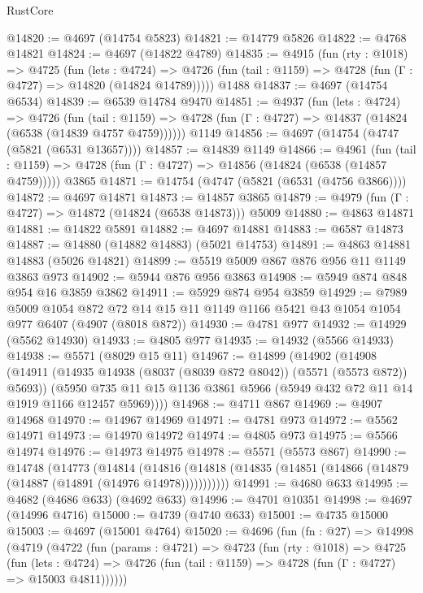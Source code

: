 \begin{lexlean}{RustCore}
\begin{coremodule}
@14820 := @4697 (@14754 @5823)
@14821 := @14779 @5826
@14822 := @4768 @14821
@14824 := @4697 (@14822 @4789)
@14835 := @4915
    (fun (rty : @1018) =>
    @4725
      (fun (lets : @4724) =>
      @4726 (fun (tail : @1159) => @4728 (fun (Γ : @4727) => @14820 (@14824 @14789)))))
    @1488
@14837 := @4697 (@14754 @6534)
@14839 := @6539 @14784 @9470
@14851 := @4937
    (fun (lets : @4724) =>
    @4726
      (fun (tail : @1159) =>
      @4728 (fun (Γ : @4727) => @14837 (@14824 (@6538 (@14839 @4757 @4759))))))
    @1149
@14856 := @4697 (@14754 (@4747 (@5821 (@6531 @13657))))
@14857 := @14839 @1149
@14866 := @4961
    (fun (tail : @1159) => @4728 (fun (Γ : @4727) => @14856 (@14824 (@6538 (@14857 @4759)))))
    @3865
@14871 := @14754 (@4747 (@5821 (@6531 (@4756 @3866))))
@14872 := @4697 @14871
@14873 := @14857 @3865
@14879 := @4979 (fun (Γ : @4727) => @14872 (@14824 (@6538 @14873))) @5009
@14880 := @4863 @14871
@14881 := @14822 @5891
@14882 := @4697 @14881
@14883 := @6587 @14873
@14887 := @14880 (@14882 @14883) (@5021 @14753)
@14891 := @4863 @14881 @14883 (@5026 @14821)
@14899 := @5519 @5009 @867 @876 @956 @11 @1149 @3863 @973
@14902 := @5944 @876 @956 @3863
@14908 := @5949 @874 @848 @954 @16 @3859 @3862
@14911 := @5929 @874 @954 @3859
@14929 := @7989
    @5009
    @1054
    @872
    @72
    @14
    @15
    @11
    @1149
    @1166
    @5421
    @43
    @1054
    @1054
    @977
    @6407
    (@4907 (@8018 @872))
@14930 := @4781 @977
@14932 := @14929 (@5562 @14930)
@14933 := @4805 @977
@14935 := @14932 (@5566 @14933)
@14938 := @5571 (@8029 @15 @11)
@14967 := @14899
    (@14902
      (@14908
        (@14911 (@14935 @14938 (@8037 (@8039 @872 @8042)) (@5571 (@5573 @872)) @5693))
        (@5950 @735 @11 @15 @1136 @3861 @5966 (@5949 @432 @72 @11 @14 @1919 @1166 @12457 @5969))))
@14968 := @4711 @867
@14969 := @4907 @14968
@14970 := @14967 @14969
@14971 := @4781 @973
@14972 := @5562 @14971
@14973 := @14970 @14972
@14974 := @4805 @973
@14975 := @5566 @14974
@14976 := @14973 @14975
@14978 := @5571 (@5573 @867)
@14990 := @14748
    (@14773
      (@14814
        (@14816 (@14818 (@14835 (@14851 (@14866 (@14879 (@14887 (@14891 (@14976 @14978)))))))))))
@14991 := @4680 @633
@14995 := @4682 (@4686 @633) (@4692 @633)
@14996 := @4701 @10351
@14998 := @4697 (@14996 @4716)
@15000 := @4739 (@4740 @633)
@15001 := @4735 @15000
@15003 := @4697 (@15001 @4764)
@15020 := @4696
    (fun (fn : @27) =>
    @14998
      (@4719
        (@4722
          (fun (params : @4721) =>
          @4723
            (fun (rty : @1018) =>
            @4725
              (fun (lets : @4724) =>
              @4726 (fun (tail : @1159) => @4728 (fun (Γ : @4727) => @15003 @4811))))))

\end{coremodule}
\end{lexlean}
